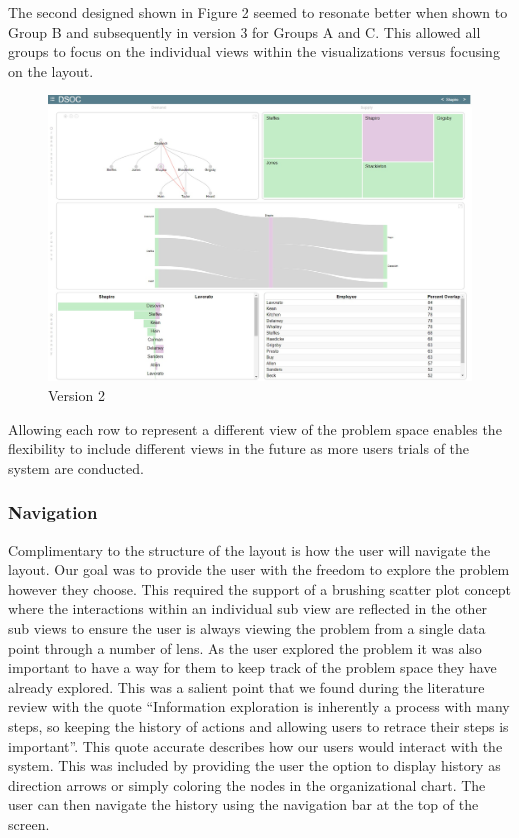 \documentclass[journal]{vgtc}                %
\begin{document}
The second designed shown in Figure 2 seemed to resonate better when shown to Group B and subsequently in version 3 for Groups A and C.  This allowed all groups to focus on the individual views within the visualizations versus focusing on the layout.

\begin{figure}
	\centering
	\includegraphics[width=\columnwidth]{pictures/version2.jpg}
	\caption{Version 2}
	\label{fig:global}
\end{figure}

Allowing each row to represent a different view of the problem space enables the flexibility to include different views in the future as more users trials of the system are conducted.

\subsubsection{Navigation}
Complimentary to the structure of the layout is how the user will navigate the layout.  Our goal was to provide the user with the freedom to explore the problem however they choose.  This required the support of a brushing scatter plot concept where the interactions within an individual sub view are reflected in the other sub views to ensure the user is always viewing the problem from a single data point through a number of lens.
As the user explored the problem it was also important to have a way for them to keep track of the problem space they have already explored.  This was a salient point that we found during the literature review with the quote “Information exploration is inherently a process with many steps, so keeping the history of actions and allowing users to retrace their steps is important”\cite{anafigueiras}.  This quote accurate describes how our users would interact with the system.  This was included by providing the user the option to display history as direction arrows or simply coloring the nodes in the organizational chart.  The user can then navigate the history using the navigation bar at the top of the screen.
\end{document}
